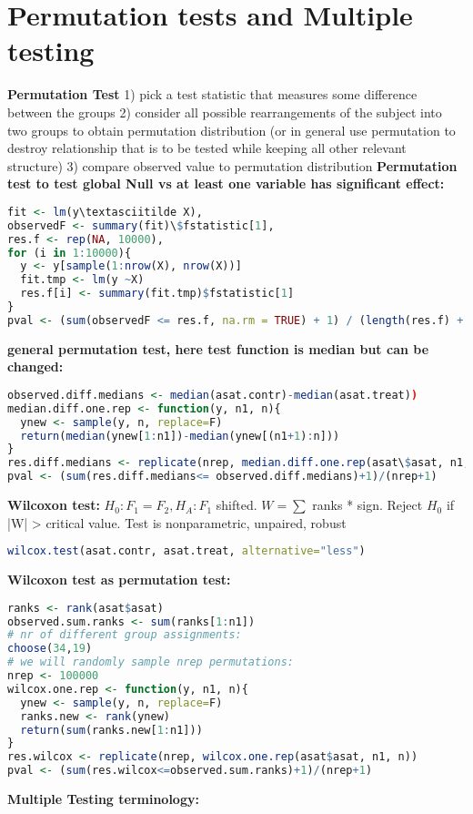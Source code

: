 \section{Permutation tests and Multiple testing}
\textbf{Permutation Test} 1) pick a test statistic that measures some difference between the groups 2) consider all possible rearrangements of the subject into two groups to obtain permutation distribution (or in general use permutation to destroy relationship that is to be tested while keeping all other relevant structure) 3) compare observed value to permutation distribution
\textbf{Permutation test to test global Null vs at least one variable has significant effect:}
\begin{lstlisting}[language=R]fit <- lm(y\textasciitilde X),
observedF <- summary(fit)\$fstatistic[1],
res.f <- rep(NA, 10000),
for (i in 1:10000){
  y <- y[sample(1:nrow(X), nrow(X))]
  fit.tmp <- lm(y ~X)
  res.f[i] <- summary(fit.tmp)$fstatistic[1]
}
pval <- (sum(observedF <= res.f, na.rm = TRUE) + 1) / (length(res.f) + 1)\end{lstlisting}
\textbf{general permutation test, here test function is median but can be changed: } \begin{lstlisting}[language=R]
observed.diff.medians <- median(asat.contr)-median(asat.treat))
median.diff.one.rep <- function(y, n1, n){
  ynew <- sample(y, n, replace=F)
  return(median(ynew[1:n1])-median(ynew[(n1+1):n]))
}
res.diff.medians <- replicate(nrep, median.diff.one.rep(asat\$asat, n1, n))
pval <- (sum(res.diff.medians<= observed.diff.medians)+1)/(nrep+1)\end{lstlisting}
\textbf{Wilcoxon test: } $H_0: F_1 = F_2, H_A: F_1$ shifted. $W = \sum$ ranks * sign. Reject $H_0$ if |W| > critical value.
Test is nonparametric, unpaired, robust \begin{lstlisting}[language=R]
wilcox.test(asat.contr, asat.treat, alternative="less")
\end{lstlisting} \textbf{Wilcoxon test as permutation test:} \begin{lstlisting}[language=R]
ranks <- rank(asat$asat)
observed.sum.ranks <- sum(ranks[1:n1])
# nr of different group assignments:
choose(34,19)
# we will randomly sample nrep permutations:
nrep <- 100000
wilcox.one.rep <- function(y, n1, n){
  ynew <- sample(y, n, replace=F)
  ranks.new <- rank(ynew)
  return(sum(ranks.new[1:n1]))
}
res.wilcox <- replicate(nrep, wilcox.one.rep(asat$asat, n1, n))
pval <- (sum(res.wilcox<=observed.sum.ranks)+1)/(nrep+1)\end{lstlisting}
\textbf{Multiple Testing terminology: }

